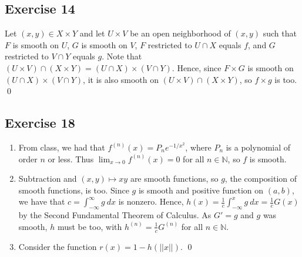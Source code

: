 \documentclass{article}
\newcommand{\N}{\mathbb{N}}
\begin{document}
\subsection*{Exercise 14}
  Let $(x,y)\in X\times Y$ and let $U\times V$ be an open neighborhood of
  $(x,y)$ such that $F$ is smooth on $U$, $G$ is smooth on $V$, $F$ restricted
  to $U\cap X$ equals $f$, and $G$ restricted to $V\cap Y$ equals $g$. Note that
  $(U\times V)\cap(X\times Y)=(U\cap X)\times(V\cap Y)$. Hence, since $F\times
  G$ is smooth on $(U\cap X)\times(V\cap Y)$, it is also smooth on $(U\times V)
  \cap(X\times Y)$, so $f\times g$ is too.
  \qed

\subsection*{Exercise 18}
  \begin{enumerate}[label=\textbf{\alph*}]
    \item{
      From class, we had that $f^{(n)}(x)=P_ne^{-1/{x^2}}$, where $P_n$ is a
      polynomial of order $n$ or less. Thus $\lim_{x\to0}f^{(n)}(x)=0$ for all
      $n\in\N$, so $f$ is smooth.
    }
    \item{
      Subtraction and $(x,y)\mapsto xy$ are smooth functions, so $g$, the
      composition of smooth functions, is too. Since $g$ is smooth and positive
      function on $(a,b)$, we have that $c=\int_{-\infty}^{\infty}g\ dx$ is
      nonzero. Hence, $h(x)=\frac{1}{c}\int_{-\infty}^{x}g\ dx=\frac{1}{c}G(x)$
      by the Second Fundamental Theorem of Calculus. As $G'=g$ and $g$ was
      smooth, $h$ must be too, with $h^{(n)}=\frac{1}{c}G^{(n)}$ for all
      $n\in\N$.
    }
    \item{
      Consider the function $r(x)=1-h(\vert\vert x\vert\vert)$.
    }
    \qed
  \end{enumerate}
\end{document}
